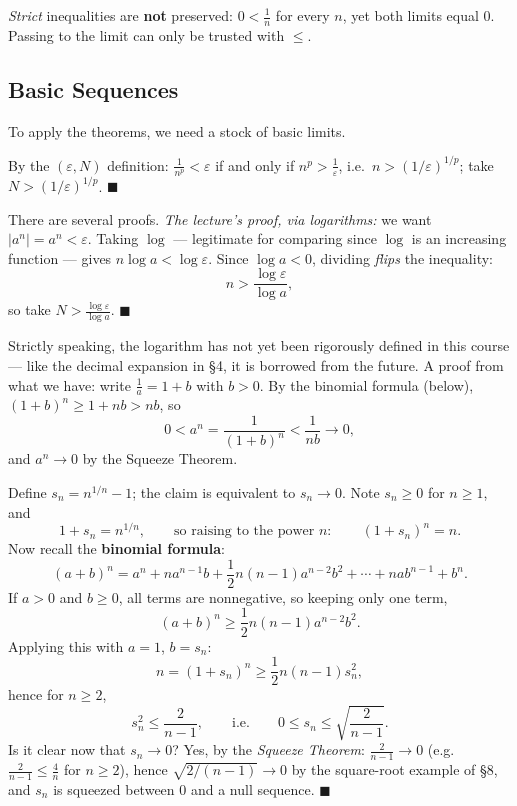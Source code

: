 \documentclass[11pt]{report}
\begin{document}
\begin{rembox}
\emph{Strict} inequalities are \textbf{not} preserved: $0 < \tfrac1n$ for every $n$, yet both limits equal $0$. Passing to the limit can only be trusted with $\leq$.
\end{rembox}

\subsection{Basic Sequences}

To apply the theorems, we need a stock of basic limits.

\begin{exbox}[$1/n^p \to 0$ for $p > 0$]
By the $(\varepsilon, N)$ definition: $\tfrac{1}{n^p} < \varepsilon$ if and only if $n^p > \tfrac1\varepsilon$, i.e.\ $n > (1/\varepsilon)^{1/p}$; take $N > (1/\varepsilon)^{1/p}$. \hfill $\blacksquare$
\end{exbox}

\begin{exbox}[$a^n \to 0$ for $0 < a < 1$]
There are several proofs. \emph{The lecture's proof, via logarithms:} we want $|a^n| = a^n < \varepsilon$. Taking $\log$ --- legitimate for comparing since $\log$ is an increasing function --- gives $n \log a < \log \varepsilon$. Since $\log a < 0$, dividing \emph{flips} the inequality:
\[
n > \frac{\log \varepsilon}{\log a},
\]
so take $N > \tfrac{\log\varepsilon}{\log a}$. \hfill $\blacksquare$
\end{exbox}

\begin{rembox}
Strictly speaking, the logarithm has not yet been rigorously defined in this course --- like the decimal expansion in \S 4, it is borrowed from the future. A proof from what we have: write $\tfrac1a = 1 + b$ with $b > 0$. By the binomial formula (below), $(1+b)^n \geq 1 + nb > nb$, so
\[
0 < a^n = \frac{1}{(1+b)^n} < \frac{1}{nb} \longrightarrow 0,
\]
and $a^n \to 0$ by the Squeeze Theorem.
\end{rembox}

\begin{exbox}[$n^{1/n} \to 1$]
Define $s_n = n^{1/n} - 1$; the claim is equivalent to $s_n \to 0$. Note $s_n \geq 0$ for $n \geq 1$, and
\[
1 + s_n = n^{1/n}, \qquad \text{so raising to the power } n: \qquad (1 + s_n)^n = n.
\]
Now recall the \textbf{binomial formula}:
\[
(a+b)^n = a^n + n a^{n-1} b + \frac12 n(n-1) a^{n-2} b^2 + \cdots + n a b^{n-1} + b^n.
\]
If $a > 0$ and $b \geq 0$, all terms are nonnegative, so keeping only one term,
\[
(a+b)^n \geq \frac12 n(n-1) a^{n-2} b^2.
\]
Applying this with $a = 1$, $b = s_n$:
\[
n = (1 + s_n)^n \geq \frac12 n(n-1) s_n^2,
\]
hence for $n \geq 2$,
\[
s_n^2 \leq \frac{2}{n-1}, \qquad \text{i.e.} \qquad 0 \leq s_n \leq \sqrt{\frac{2}{n-1}}.
\]
Is it clear now that $s_n \to 0$? Yes, by the \emph{Squeeze Theorem}: $\tfrac{2}{n-1} \to 0$ (e.g.\ $\tfrac{2}{n-1} \leq \tfrac4n$ for $n \geq 2$), hence $\sqrt{2/(n-1)} \to 0$ by the square-root example of \S 8, and $s_n$ is squeezed between $0$ and a null sequence. \hfill $\blacksquare$
\end{exbox}
\end{document}
